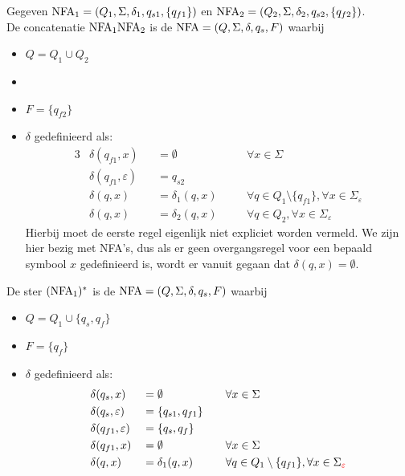 \documentclass[../aanvullingen_cursus.tex]{subfiles}
\begin{document}
Gegeven \(\text{NFA}_1 = (Q_1,\Sigma,\delta_1,q_{s1},\{q_{f1}\})\) en \(\text{NFA}_2 = (Q_2,\Sigma,\delta_2,q_{s2},\{q_{f2}\})\). \\

De concatenatie \(\text{NFA}_1\text{NFA}_2\) is de \(\text{NFA} = (Q,\Sigma,\delta,q_s,F)\) waarbij

\begin{itemize}
	\item \(Q = Q_1 \cup Q_2\)
	\item \rood[\( q_s=q_{s1} \)]
	\item \(F = \{q_{f2}\}\)
	\item \(\delta\) gedefinieerd als:
	\begin{alignat*}{3}
		& \delta(q_{f1}, x)           &  & = \emptyset      &  & \quad \forall x \in \Sigma                                                     \\
		& \delta(q_{f1}, \varepsilon) &  & = q_{s2}         &  &                                                                                \\
		& \delta(q, x)                &  & = \delta_1(q, x) &  & \quad \forall q \in Q_1 \setminus \{q_{f1}\}, \forall x \in \Sigma_\varepsilon \\
		& \delta(q, x)                &  & = \delta_2(q, x) &  & \quad \forall q \in Q_2, \forall x \in \Sigma_\varepsilon
	\end{alignat*}
	Hierbij moet de eerste regel eigenlijk niet expliciet worden vermeld. We zijn hier bezig met NFA's, dus als er geen overgangsregel voor een bepaald symbool \( x \) gedefinieerd is, wordt er vanuit gegaan dat \( \delta(q,x)=\emptyset \).
\end{itemize}

De ster \((\text{NFA}_1)^*\) is de \(\text{NFA} = (Q,\Sigma,\delta,q_s,F)\) waarbij

\begin{itemize}
	\item \(Q = Q_1 \cup \{q_s,q_f\}\)
	\item \(F = \{q_{f}\}\)
	\item \(\delta\) gedefinieerd als:
	\begin{alignat*}{3}
		& \delta(q_{s}, x)            &  & = \emptyset         &  & \quad \forall x \in \Sigma                                \\
		& \delta(q_{s}, \varepsilon)  &  & = \{q_{s1},q_{f1}\} &  &                                                           \\
		& \delta(q_{f1}, \varepsilon) &  & = \{q_{s},q_{f}\}   &  &                                                           \\
		& \delta(q_{f1}, x)            &  & = \emptyset    &  & \quad \forall x \in \Sigma \\
		& \delta(q, x)                &  & = \delta_1(q, x)    &  & \quad \forall q \in Q_1 \setminus \{q_{f1}\}, \forall x \in \Sigma_{\rood[\varepsilon]}
	\end{alignat*}
\end{itemize}
\end{document}
